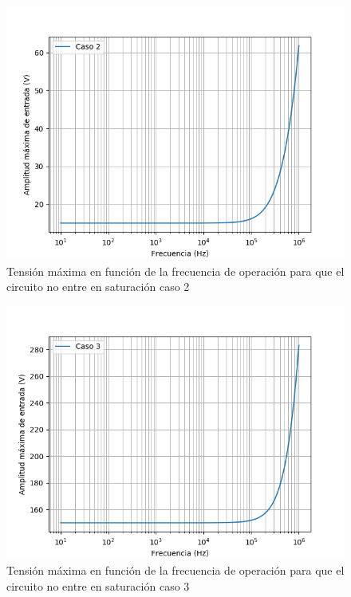 \begin{figure}[H]
\begin{centering}
\includegraphics[scale=0.5]{../Ex1/iA/Resources1a/sat2}
\par\end{centering}
\begin{centering}
\caption{Tensión máxima en función de la frecuencia de operación para que el
circuito no entre en saturación caso 2}
\par\end{centering}
\end{figure}

\begin{figure}[H]
\begin{centering}
\includegraphics[scale=0.5]{../Ex1/iA/Resources1a/sat3}
\par\end{centering}
\begin{centering}
\caption{Tensión máxima en función de la frecuencia de operación para que el
circuito no entre en saturación caso 3}
\par\end{centering}
\end{figure}

